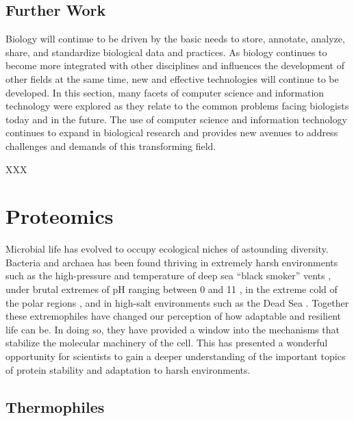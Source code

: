 \subsection{Further Work}

Biology will continue to be driven by the basic needs to store, annotate,
analyze, share, and standardize biological data and practices. As biology
continues to become more integrated with other disciplines and influences the
development of other fields at the same time, new and effective technologies
will continue to be developed. In this section, many facets of computer science
and information technology were explored as they relate to the common problems
facing biologists today and in the future.  The use of computer science and
information technology continues to expand in biological research and provides
new avenues to address challenges and demands of this transforming field.



XXX
\section{Proteomics}

Microbial life has evolved to occupy ecological niches of astounding diversity.
Bacteria and archaea has been found thriving in extremely harsh environments
such as the high-pressure and temperature of deep sea ``black smoker'' vents
\cite{blochl1997pfg}, under brutal extremes of pH ranging between 0 and 11
\cite{2,4}, in the extreme cold of the polar regions \cite{6,7}, and in
high-salt environments such as the Dead Sea \cite{5}.  Together these
extremophiles have changed our perception of how adaptable and resilient life
can be. In doing so, they have provided a window into the mechanisms that
stabilize the molecular machinery of the cell. This has presented a wonderful
opportunity for scientists to gain a deeper understanding of the important
topics of protein stability and adaptation to harsh environments.

\subsection{Thermophiles}

